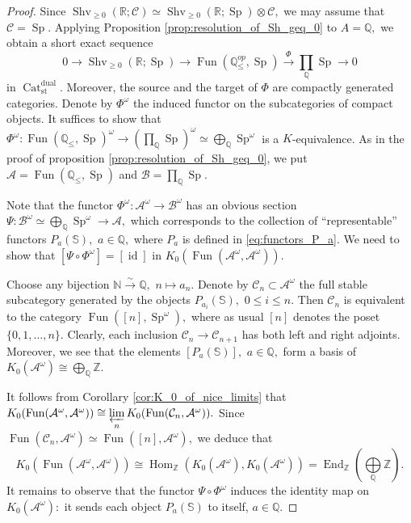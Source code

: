 \documentclass[11pt,leqno]{amsart}
\numberwithin{equation}{section}
\def\N{\mathbb{N}}
\def\R{\mathbb{R}}
\def\bS{\mathbb{S}}
\def\Z{\mathbb{Z}}
\def\Q{\mathbb{Q}}
\def\Hom{\operatorname{Hom}}
\def\End{\operatorname{End}}
\newcommand{\prolim}[1][]{\mathop{\varprojlim}\limits_{#1}}
\newcommand{\biggplus}[1][]{\mathop{\bigoplus}\limits_{#1}}
\newcommand{\prodd}[1][]{\mathop{\prod}\limits_{#1}}
\newcommand{\xto}{\xrightarrow}
\newcommand{\Cat}{\operatorname{Cat}}
\newcommand{\st}{\operatorname{st}}
\newcommand{\dual}{\operatorname{dual}}
\newcommand{\cA}{{\mathcal A}}
\newcommand{\cB}{{\mathcal B}}
\newcommand{\cC}{{\mathcal C}}
\newcommand{\Fun}{\operatorname{Fun}}
\newcommand{\Sh}{\operatorname{Shv}}
\newcommand{\Sp}{\operatorname{Sp}}
\newcommand{\id}{\operatorname{id}}
\begin{document}
\begin{proof}Since $\Sh_{\geq 0}(\R;\cC)\simeq \Sh_{\geq 0}(\R;\Sp)\otimes\cC,$ we may assume that $\cC=\Sp.$ Applying  Proposition \ref{prop:resolution_of_Sh_geq_0} to $A=\Q,$ we obtain a short exact sequence
$$0\to\Sh_{\geq 0}(\R;\Sp)\to\Fun(\Q_{\leq}^{op},\Sp)\xto{\Phi}\prodd[\Q]\Sp\to 0$$
in $\Cat_{\st}^{\dual}.$ Moreover, the source and the target of $\Phi$ are compactly generated categories. Denote by $\Phi^{\omega}$ the induced functor on the subcategories of compact objects. It suffices to show that $\Phi^{\omega}:\Fun(\Q_{\leq},\Sp)^{\omega}\to (\prodd[\Q]\Sp)^{\omega}\simeq\biggplus[\Q]\Sp^{\omega}$ is a $K$-equivalence. As in the proof of proposition \ref{prop:resolution_of_Sh_geq_0}, we put $\cA=\Fun(\Q_{\leq},\Sp)$ and $\cB=\prodd[\Q]\Sp.$

Note that the functor $\Phi^{\omega}:\cA^{\omega}\to\cB^{\omega}$ has an obvious section $\Psi:\cB^{\omega}\simeq \biggplus[\Q]\Sp^{\omega}\to \cA,$ which corresponds to the collection of ``representable'' functors $P_a(\bS),$ $a\in\Q,$ where $P_a$ is defined in \eqref{eq:functors_P_a}. We need to show that $[\Psi\circ\Phi^{\omega}]=[\id]$ in $K_0(\Fun(\cA^{\omega},\cA^{\omega})).$

Choose any bijection $\N\xto{\sim}\Q,$ $n\mapsto a_n.$ Denote by $\cC_n\subset \cA^{\omega}$ the full stable subcategory generated by the objects $P_{a_i}(\bS),$ $0\leq i\leq n.$ Then $\cC_n$ is equivalent to the category $\Fun([n],\Sp^{\omega}),$ where as usual $[n]$ denotes the poset $\{0,1,\dots,n\}.$ Clearly, each inclusion $\cC_n\to\cC_{n+1}$ has both left and right adjoints. Moreover, we see that the elements $[P_a(\bS)],$ $a\in\Q,$ form a basis of $K_0(\cA^{\omega})\cong\biggplus[\Q]\Z.$

It follows from Corollary \ref{cor:K_0_of_nice_limits} that $K_0(\Fun(\cA^{\omega},\cA^{\omega}))\cong\prolim[n]K_0(\Fun(\cC_n,\cA^{\omega})).$ Since $\Fun(\cC_n,\cA^{\omega})\simeq\Fun([n],\cA^{\omega}),$ we deduce that 
$$K_0(\Fun(\cA^{\omega},\cA^{\omega}))\cong\Hom_{\Z}(K_0(\cA^{\omega}),K_0(\cA^{\omega}))=\End_{\Z}(\biggplus[\Q]\Z).$$ It remains to observe that the functor $\Psi\circ\Phi^{\omega}$ induces the identity map on $K_0(\cA^{\omega}):$ it sends each object $P_a(\bS)$ to itself, $a\in\Q.$\end{proof}

\end{document}
